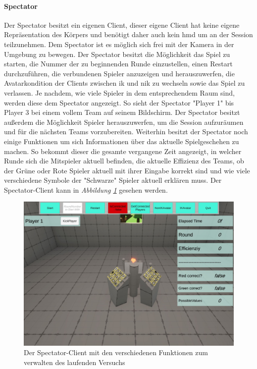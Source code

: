\documentclass[a4paper,11pt]{article}%
\renewcommand{\\}{\vspace*{0.5\baselineskip} \newline}
\begin{document}
\paragraph{Spectator}
Der Spectator besitzt ein eigenen Client, dieser eigene Client hat keine eigene Repräsentation des Körpers und benötigt daher auch kein \ac{hmd} um an der Session teilzunehmen. Dem Spectator ist es möglich sich frei mit der Kamera in der Umgebung zu bewegen.
Der Spectator besitzt die Möglichkeit das Spiel zu starten, die Nummer der zu beginnenden Runde einzustellen, einen Restart durchzuführen, die verbundenen Spieler anzuzeigen und herauszuwerfen, die Avatarkondition der Clients zwischen \ac{ik} und \ac{nik} zu wechseln sowie das Spiel zu verlassen.
Je nachdem, wie viele Spieler in dem entsprechendem Raum sind, werden diese dem Spectator angezeigt. So sieht der Spectator "Player 1" bis \dq{}Player 3\dq{} bei einem vollem Team auf seinem Bildschirm. Der Spectator besitzt außerdem die Möglichkeit Spieler herauszuwerfen, um die Session aufzuräumen und für die nächsten Teams vorzubereiten.
Weiterhin besitzt der Spectator noch einige Funktionen um sich Informationen über das aktuelle Spielgeschehen zu machen. So bekommt dieser die gesamte vergangene Zeit angezeigt, in welcher Runde sich die Mitspieler aktuell befinden, die aktuelle Effizienz des Teams, ob der \dq{}Grüne\dq{} oder \dq{}Rote\dq{} Spieler aktuell mit ihrer Eingabe korrekt sind und wie viele verschiedene Symbole der "Schwarze" Spieler aktuell erklären muss. Der Spectator-Client kann in \textit{Abbildung \ref{SpectatorView}}  gesehen werden.

\begin{figure}[H]
		\begin{footnotesize}
		\centering
			\includegraphics[scale=0.3]{Abbildungen/Versuchsumgebung/SpectatorView.JPG}
			
			\caption[Abbildung 1]{Der Spectator-Client mit den verschiedenen Funktionen zum verwalten des laufenden Versuchs}
			\label{SpectatorView}
		\end{footnotesize}
	\end{figure}
	
\end{document}
